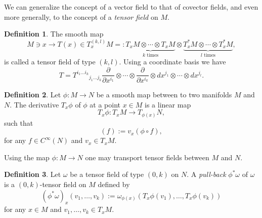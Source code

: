\documentclass[a4paper]{article}
\theoremstyle{definition}
\newtheorem{defn}{Definition}
\theoremstyle{plain}
\begin{document}
    We can generalize the concept of a vector field to that
    of covector fields, and even more generally, to the
    concept of a \textit{tensor field} on $M$.

    \begin{defn}
        The smooth map
        \begin{equation}
            M \ni x \to T(x) \in T_x^{(k,l)}M
            =: \underbrace{T_xM \otimes \cdots \otimes
            T_xM}_{\text{$k$ times}} \otimes 
            \underbrace{T_x^{*}M \otimes \cdots \otimes
            T_x^{*}M}_{\text{$l$ times}},
        \end{equation}
        is called a tensor field of type $(k,l)$. Using a
        coordinate basis we have
        \begin{equation}
            T
            = T^{i_1\ldots i_k}{}_{j_1\ldots j_k} 
            \frac{\partial}{\partial x^{i_1}} \otimes \cdots
            \otimes \frac{\partial}{\partial x^{i_k}}
            \otimes dx^{j_1} \otimes \cdots \otimes
            dx^{j_l}.
        \end{equation}
    \end{defn}

    \begin{defn}
        Let $\phi : M \to N$ be a smooth map between to two
        manifolds $M$ and $N$. The derivative $T_x\phi$ of
        $\phi$ at a point $x \in M$ is a linear map
        \begin{equation}
            T_x \phi
            : T_xM \to T_{\phi(x)}N,
        \end{equation}
        such that
        \begin{equation}
            [T_x\phi(v_x)](f)
            := v_x(\phi \circ f),
        \end{equation}
        for any $f \in C^{\infty}(N)$ and $v_x \in T_xM$.
    \end{defn}

    Using the map $\phi : M \to N$ one may transport tensor
    fields between $M$ and $N$. 

    \begin{defn}
        Let $\omega$ be a tensor field of type $(0,k)$ on
        $N$. A \textit{pull-back} $\phi^{*}\omega$ of
        $\omega$ is a $(0,k)$-tensor field on $M$ defined by
        \begin{equation}
            (\phi^{*}\omega)_x(v_1,\ldots,v_k)
            :=
            \omega_{\phi(x)}(T_x\phi(v_1),\ldots,T_x\phi(v_k))
        \end{equation}
        for any $x \in M$ and $v_1,\ldots,v_k \in T_xM$.
    \end{defn}
\end{document}
